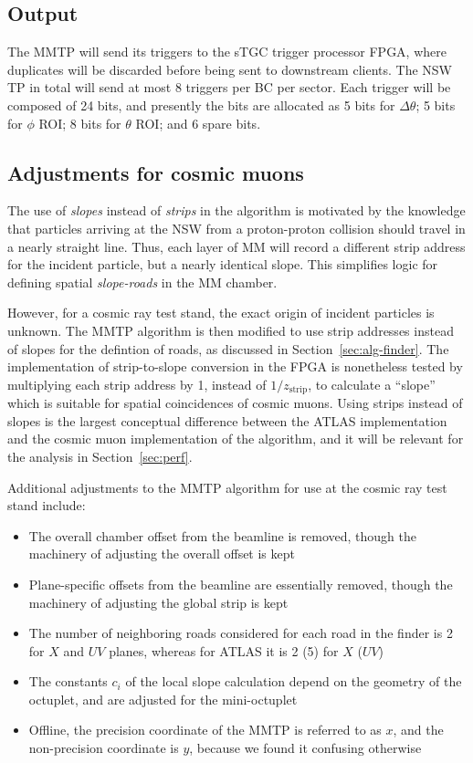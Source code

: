 \subsection{Output}
\label{sec:alg-output}

The MMTP will send its triggers to the sTGC trigger processor FPGA, where duplicates will be discarded before being sent to downstream clients.
 The NSW TP in total will send at most 8 triggers per BC per sector. Each trigger will be composed of 24 bits,
 and presently the bits are allocated as 5 bits for $\Delta\theta$; 5 bits for $\phi$ ROI; 8 bits for $\theta$ ROI; and 6 spare bits.

\subsection{Adjustments for cosmic muons}
\label{sec:alg-crts}

The use of \textit{slopes} instead of \textit{strips} in the algorithm is motivated by the knowledge that particles arriving at the NSW from a proton-proton
 collision should travel in a nearly straight line. Thus, each layer of MM will record a different strip address for the incident particle,
 but a nearly identical slope. This simplifies logic for defining spatial \textit{slope-roads} in the MM chamber.

However, for a cosmic ray test stand, the exact origin of incident particles is unknown.
 The MMTP algorithm is then modified to use strip addresses instead of slopes for the defintion of roads,
 as discussed in Section~\ref{sec:alg-finder}. The implementation of strip-to-slope conversion in the FPGA is
 nonetheless tested by multiplying each strip address by 1, instead of $1/z_\text{strip}$, 
to calculate a ``slope'' which is suitable for spatial coincidences of cosmic muons. 
Using strips instead of slopes is the largest conceptual difference between the ATLAS implementation and the cosmic 
muon implementation of the algorithm, and it will be relevant for the analysis in Section~\ref{sec:perf}.

Additional adjustments to the MMTP algorithm for use at the cosmic ray test stand include:

\begin{itemize}
  \item The overall chamber offset from the beamline is removed, though the machinery of adjusting the overall offset is kept
  \item Plane-specific offsets from the beamline are essentially removed, though the machinery of adjusting the global strip is kept
  \item The number of neighboring roads considered for each road in the finder is 2 for $X$ and $UV$ planes, whereas for ATLAS it is 2 (5) for $X$ ($UV$)
  \item The constants $c_i$ of the local slope calculation depend on the geometry of the octuplet, and are adjusted for the mini-octuplet
  \item Offline, the precision coordinate of the MMTP is referred to as $x$, and the non-precision coordinate is $y$,
 because we found it confusing otherwise
\end{itemize}

